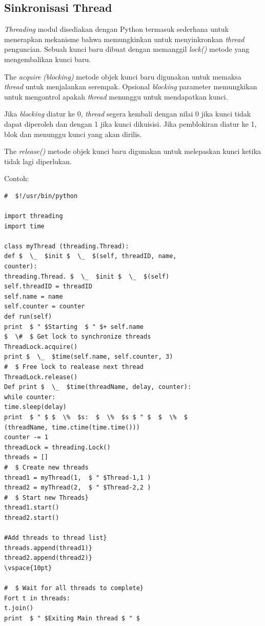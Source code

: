\subsection{Sinkronisasi Thread} \par
\hspace*{0.5in} \textit{T}\textit{hread}\textit{ing }modul disediakan dengan Python termasuk sederhana untuk menerapkan mekanisme bahwa memungkinkan untuk menyinkronkan \textit{thread}\textit{ }penguncian. Sebuah kunci baru dibuat dengan memanggil \textit{lock() }metode yang mengembalikan kunci baru. \par
\hspace*{0.5in} The \textit{acquire}\textit{ }\textit{(blocking)}\textit{ }metode objek kunci baru digunakan untuk memaksa \textit{thread}\textit{ }untuk menjalankan serempak. Opsional \textit{blocking} parameter memungkikan untuk mengontrol apakah\textit{ thread} menunggu untuk mendapatkan kunci. \par
\hspace*{0.5in} Jika \textit{blocking} diatur ke 0, \textit{thread} segera kembali dengan nilai 0 jika kunci tidak dapat diperoleh dan dengan 1 jika kunci dikuisisi. Jika pemblokiran diatur ke 1, blok dan menunggu kunci yang akan dirilis. \par
\hspace*{0.5in}The \textit{release()} metode objek kunci baru digunakan untuk melepaskan kunci ketika tidak lagi diperlukan.  \par
\noindent 

\vspace{12pt}
Contoh: 
\begin{verbatim}
#  $!/usr/bin/python

import threading
import time

class myThread (threading.Thread): 
def $  \_  $init $  \_  $(self, threadID, name, 
counter):
threading.Thread. $  \_  $init $  \_  $(self)
self.threadID = threadID
self.name = name
self.counter = counter
def run(self) 
print  $ " $Starting  $ " $+ self.name 
$  \#  $ Get lock to synchronize threads 
ThreadLock.acquire() 
print $  \_  $time(self.name, self.counter, 3) 
#  $ Free lock to realease next thread
ThreadLock.release()
Def print $  \_  $time(threadName, delay, counter):
while counter:
time.sleep(delay)
print  $ " $ $  \%  $s:  $  \%  $s $ " $  $  \%  $ 
(threadName, time.ctime(time.time()))
counter -= 1
threadLock = threading.Lock() 
threads = []
#  $ Create new threads
thread1 = myThread(1,  $ " $Thread-1,1 ) 
thread2 = myThread(2,  $ " $Thread-2,2 )
#  $ Start new Threads} 
thread1.start() 
thread2.start()

#Add threads to thread list} 
threads.append(thread1)} 
thread2.append(thread2)} 
\vspace{10pt}

#  $ Wait for all threads to complete}  
Fort t in threads:
t.join()
print  $ " $Exiting Main thread $ " $
\end{verbatim}

